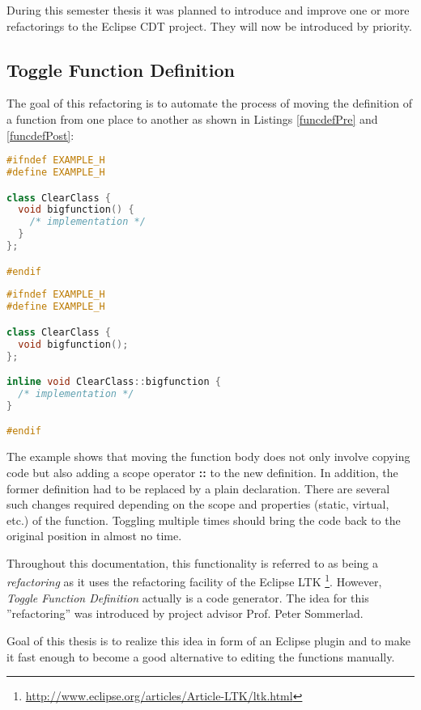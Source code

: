 During this semester thesis it was planned to introduce and improve one or more
refactorings to the Eclipse CDT project. They will now be introduced by 
priority.

\subsection{Toggle Function Definition}
The goal of this refactoring is to automate the process of moving the definition 
of a function from one place to another as shown in Listings
\ref{funcdefPre} and \ref{funcdefPost}:\newline

\begin{lstlisting}[caption={Initial situation: member function defined inside a
class},label={funcdefPre},language=C++]
#ifndef EXAMPLE_H
#define EXAMPLE_H

class ClearClass {
  void bigfunction() {
    /* implementation */
  }
};

#endif
\end{lstlisting}

\begin{lstlisting}[caption={Separated definition after toggling},
label={funcdefPost},language=C++]
#ifndef EXAMPLE_H
#define EXAMPLE_H

class ClearClass {
  void bigfunction();
};

inline void ClearClass::bigfunction {
  /* implementation */
}

#endif
\end{lstlisting}

The example shows that moving the function body does not only involve copying 
code but also adding a scope operator \textbf{::} to the new definition. In
addition, the 
former definition had to be replaced by a plain declaration. There are several 
such changes required depending on the scope and properties (static, virtual, 
etc.) of the function. Toggling multiple times should bring the code back to the 
original position in almost no time. 

Throughout this documentation, this functionality is referred to as being a 
\textit{refactoring} as it uses the refactoring facility of the Eclipse LTK
\footnote{\url{http://www.eclipse.org/articles/Article-LTK/ltk.html}}. However, 
\textit{Toggle Function Definition} actually is a code generator. The idea for 
this ''refactoring'' was introduced by project advisor Prof. Peter Sommerlad.

Goal of this thesis is to realize this idea in form of an Eclipse plugin and to 
make it fast enough to become a good alternative to editing the functions 
manually. 


